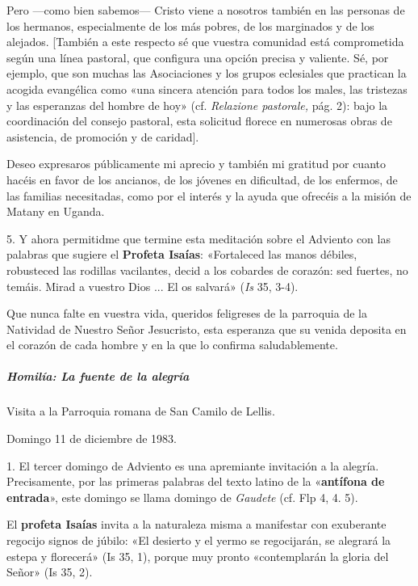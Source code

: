 \documentclass[]{article}
\let\oldsubparagraph\subparagraph
\renewcommand{\subparagraph}[1]{\oldsubparagraph{#1}\mbox{}}
\begin{document}
Pero ---como bien sabemos--- Cristo viene a nosotros también en las
personas de los hermanos, especialmente de los más pobres, de los
marginados y de los alejados. {[}También a este respecto sé que vuestra
comunidad está comprometida según una línea pastoral, que configura una
opción precisa y valiente. Sé, por ejemplo, que son muchas las
Asociaciones y los grupos eclesiales que practican la acogida evangélica
como «una sincera atención para todos los males, las tristezas y las
esperanzas del hombre de hoy» (cf. \emph{Relazione pastorale,} pág. 2):
bajo la coordinación del consejo pastoral, esta solicitud florece en
numerosas obras de asistencia, de promoción y de caridad{]}.

Deseo expresaros públicamente mi aprecio y también mi gratitud por
cuanto hacéis en favor de los ancianos, de los jóvenes en dificultad, de
los enfermos, de las familias necesitadas, como por el interés y la
ayuda que ofrecéis a la misión de Matany en Uganda.

5. Y ahora permitidme que termine esta meditación sobre el Adviento con
las palabras que sugiere el \textbf{Profeta Isaías}: «Fortaleced las
manos débiles, robusteced las rodillas vacilantes, decid a los cobardes
de corazón: sed fuertes, no temáis. Mirad a vuestro Dios ... El os
salvará» (\emph{Is} 35, 3-4).

Que nunca falte en vuestra vida, queridos feligreses de la parroquia de
la Natividad de Nuestro Señor Jesucristo, esta esperanza que su venida
deposita en el corazón de cada hombre y en la que lo confirma
saludablemente.

\protect\hypertarget{_Toc448662740}{}{\protect\hypertarget{_Toc448690259}{}{\protect\hypertarget{_Toc448708282}{}{\protect\hypertarget{_Toc448709368}{}{\protect\hypertarget{_Toc449554370}{}{}}}}}

\subparagraph{Homilía: La fuente de la
alegría}\label{homiluxeda-la-fuente-de-la-alegruxeda}

Visita a la Parroquia romana de San Camilo de Lellis. 

Domingo 11 de diciembre de 1983.

1. El tercer domingo de Adviento es una apremiante invitación a la
alegría. Precisamente, por las primeras palabras del texto latino de la
«\textbf{antífona de entrada}», este domingo se llama domingo de
\emph{Gaudete} (cf. Flp 4, 4. 5).

El \textbf{profeta Isaías} invita a la naturaleza misma a manifestar con
exuberante regocijo signos de júbilo: «El desierto y el yermo se
regocijarán, se alegrará la estepa y florecerá» (Is 35, 1), porque muy
pronto «contemplarán la gloria del Señor» (Is 35, 2).
\end{document}
